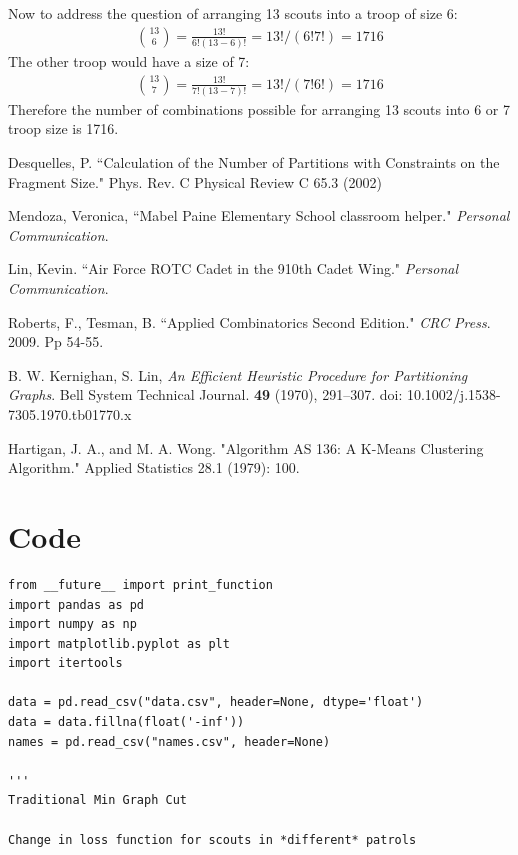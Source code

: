 \documentclass{amsart}
\theoremstyle{definition}
\theoremstyle{remark}
\numberwithin{equation}{section}
\begin{document}
Now to address the question of arranging 13 scouts into a troop of size 6:
\begin{gather*}
	\binom{13}{6} = \frac{13!}{6!(13-6)!} = 13!/(6!7!) = 1716
\end{gather*}
The other troop would have a size of 7:
\begin{gather*}
	\binom{13}{7} = \frac{13!}{7!(13-7)!} = 13!/(7!6!) = 1716
\end{gather*}
Therefore the number of combinations possible for arranging 13 scouts into 6 or 7 troop size is 1716.

\begin{thebibliography}{10}

 Desquelles, P. ``Calculation of the Number of Partitions with Constraints on the Fragment Size." Phys. Rev. C Physical Review C 65.3 (2002)

 Mendoza, Veronica, ``Mabel Paine Elementary School classroom helper." \textit{Personal Communication}.

 Lin, Kevin. ``Air Force ROTC Cadet in the 910th Cadet Wing." \textit{Personal Communication}.

 Roberts, F., Tesman, B. ``Applied Combinatorics Second Edition." \textit{CRC Press}. 2009. Pp 54-55.

 B. W. Kernighan, S. Lin, \textit{An Efficient Heuristic Procedure for Partitioning Graphs}. Bell System Technical Journal. \textbf{49} (1970), 291--307. doi: 10.1002/j.1538-7305.1970.tb01770.x

 Hartigan, J. A., and M. A. Wong. "Algorithm AS 136: A K-Means Clustering Algorithm." Applied Statistics 28.1 (1979): 100.




\clearpage

\section*{Code}

\begin{lstlisting}
from __future__ import print_function
import pandas as pd
import numpy as np
import matplotlib.pyplot as plt
import itertools

data = pd.read_csv("data.csv", header=None, dtype='float')
data = data.fillna(float('-inf'))
names = pd.read_csv("names.csv", header=None)

'''
Traditional Min Graph Cut

Change in loss function for scouts in *different* patrols


\end{lstlisting}
\end{thebibliography}
\end{document}

